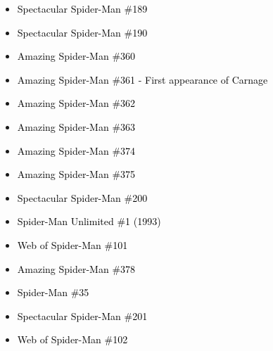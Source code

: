 \documentclass[12pt]{article}
\newcommand{\checkbox}{\raisebox{0.0ex}{\fbox{\rule{0ex}{1.5ex} \rule{1.5ex}{0ex}}}}
\begin{document}
\begin{center}
\begin{tcolorbox}[colback=white!95!gray, colframe=black, width=0.9\textwidth, arc=4mm, auto outer arc, boxrule=0.8pt]
\begin{itemize}[left=0pt,label={\checkbox}]
    \item \textcolor{black}{Spectacular Spider-Man \#189}
    \item \textcolor{black}{Spectacular Spider-Man \#190}
    \item \textcolor{black}{Amazing Spider-Man \#360}
    \item \textcolor{black}{Amazing Spider-Man \#361 - First appearance of Carnage}
    \item \textcolor{black}{Amazing Spider-Man \#362}
    \item \textcolor{black}{Amazing Spider-Man \#363}
    \item \textcolor{black}{Amazing Spider-Man \#374}
    \item \textcolor{black}{Amazing Spider-Man \#375}
    \item \textcolor{black}{Spectacular Spider-Man \#200}
    \item \textcolor{black}{Spider-Man Unlimited \#1 (1993)}
    \item \textcolor{black}{Web of Spider-Man \#101}
    \item \textcolor{black}{Amazing Spider-Man \#378}
    \item \textcolor{black}{Spider-Man \#35}
    \item \textcolor{black}{Spectacular Spider-Man \#201}
    \item \textcolor{black}{Web of Spider-Man \#102}
\end{itemize}
\end{tcolorbox}
\end{center}
\end{document}

